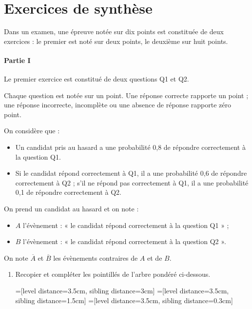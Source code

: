 \documentclass[11pt,fleqn, openany]{book} %
\begin{document}
\section*{Exercices de synthèse}

\begin{exercise}[subtitle={(Sujet zéro 2024)}]

Dans un examen, une épreuve notée sur dix points est constituée de deux exercices : le premier est noté sur deux points, le deuxième sur huit points.

\paragraph{Partie I}

Le premier exercice est constitué de deux questions Q1 et Q2.

Chaque question est notée sur un point. Une réponse correcte rapporte un point ; une réponse incorrecte, incomplète ou une absence de réponse rapporte zéro point.

On considère que :
\begin{itemize}
\item Un candidat pris au hasard a une probabilité 0,8 de répondre correctement à la question Q1.
\item Si le candidat répond correctement à Q1, il a une probabilité 0,6 de répondre correctement à Q2 ; s'il ne répond pas correctement à Q1, il a une probabilité 0,1 de
répondre correctement à Q2.\end{itemize}

On prend un candidat au hasard et on note :
\begin{itemize}
\item $A$ l'évènement : « le candidat répond correctement à la question Q1 » ;
\item $B$ l'évènement : « le candidat répond correctement à la question Q2 ».
\end{itemize}

On note $\overline{A}$ et $\overline{B}$ les évènements contraires de $A$ et de $B$.

\begin{enumerate}
\item Recopier et compléter les pointillés de l'arbre pondéré ci-dessous.

=[level distance=3.5cm, sibling distance=3cm]
=[level distance=3.5cm, sibling distance=1.5cm]
=[level distance=3.5cm, sibling distance=0.3cm]


\end{enumerate}
\end{exercise}
\end{document}
